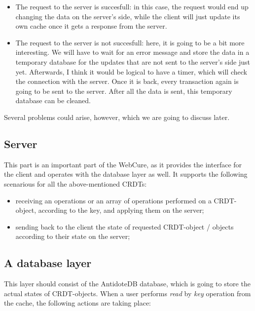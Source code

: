   \begin{itemize}
    \item{The request to the server is succesfull: in this case, the request would end up changing the data on the server's side, while the client will just update its own cache once it gets a response from the server.}
    \item{The request to the server is not succesfull: here, it is going to be a bit more interesting. We will have to wait for an error message and store the data in a temporary database for the updates that are not sent to the server's side just yet. Afterwards, I think it would be logical to have a timer, which will check the connection with the server. Once it is back, every transaction again is going to be sent to the server. After all the data is sent, this temporary database can be cleaned. }
\end{itemize}
    
    Several problems could arise, however, which we are going to discuss later.

\subsection{Server}

This part is an important part of the WebCure, as it provides the interface for the client and operates with the database layer as well. It supports the following scenarious for all the above-mentioned CRDTs:

\begin{itemize}
    \item receiving an operations or an array of operations performed on a CRDT-object, according to the key, and applying them on the server;
    \item sending back to the client the state of requested CRDT-object / objects according to their state on the server;
\end{itemize}

\subsection{A database layer}

This layer should consist of the AntidoteDB database, which is going to store the actual states of CRDT-objects. When a user performs \textit{read} by \textit{key} operation from the cache, the following actions are taking place:

